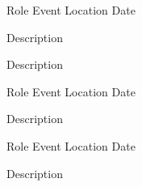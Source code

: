 

\begin{cventries}

  \cventry
    {Role} %
    {Event} %
    {Location} %
    {Date} %
    {
      \begin{cvitems} %
        \item {Description}
        \item {Description}
      \end{cvitems}
    }

  \cventry
    {Role} %
    {Event} %
    {Location} %
    {Date} %
    {
      \begin{cvitems} %
        \item {Description}
      \end{cvitems}
    }

  \cventry
    {Role} %
    {Event} %
    {Location} %
    {Date} %
    {
      \begin{cvitems} %
        \item {Description}
      \end{cvitems}
    }

\end{cventries}
